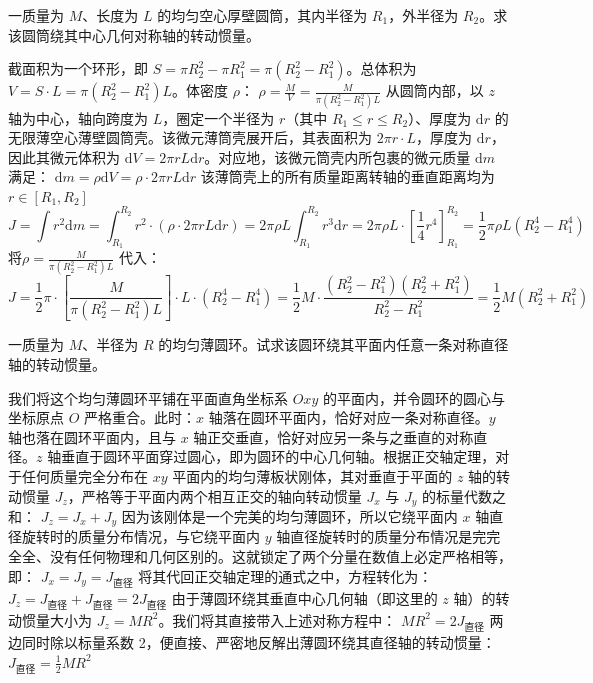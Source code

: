 \documentclass[lang=cn,11pt]{elegantbook}
\begin{document}
\begin{example}
 一质量为 $M$、长度为 $L$ 的均匀空心厚壁圆筒，其内半径为 $R_1$，外半径为 $R_2$。求该圆筒绕其中心几何对称轴的转动惯量。
\end{example}
\begin{solution}
 截面积为一个环形，即 $S = \pi R_2^2 - \pi R_1^2 = \pi(R_2^2 - R_1^2)$。总体积为 $V = S \cdot L = \pi(R_2^2 - R_1^2)L$。体密度 $\rho$： \(\rho = \frac{M}{V} = \frac{M}{\pi(R_2^2 - R_1^2)L}\) 
 从圆筒内部，以 $z$ 轴为中心，轴向跨度为 $L$，圈定一个半径为 $r$（其中 $R_1 \le r \le R_2$）、厚度为 $\mathrm{d}r$ 的无限薄空心薄壁圆筒壳。该微元薄筒壳展开后，其表面积为 $2\pi r \cdot L$，厚度为 $\mathrm{d}r$，因此其微元体积为 $\mathrm{d}V = 2\pi r L \mathrm{d}r$。对应地，该微元筒壳内所包裹的微元质量 $\mathrm{d}m$ 满足： \(\mathrm{d}m = \rho \mathrm{d}V = \rho \cdot 2\pi r L \mathrm{d}r\) 
 该薄筒壳上的所有质量距离转轴的垂直距离均为 $r\in [R_1, R_2]$
 $$J = \int r^2 \mathrm{d}m = \int_{R_1}^{R_2} r^2 \cdot \left( \rho \cdot 2\pi r L \mathrm{d}r \right)= 2\pi \rho L \int_{R_1}^{R_2} r^3 \mathrm{d}r= 2\pi \rho L \cdot \left[ \frac{1}{4}r^4 \right]_{R_1}^{R_2} = \frac{1}{2}\pi \rho L (R_2^4 - R_1^4)$$
 将$\rho = \frac{M}{\pi(R_2^2 - R_1^2)L}$ 代入：
 $$J = \frac{1}{2}\pi \cdot \left[ \frac{M}{\pi(R_2^2 - R_1^2)L} \right] \cdot L \cdot (R_2^4 - R_1^4)= \frac{1}{2}M \cdot \frac{(R_2^2 - R_1^2)(R_2^2 + R_1^2)}{R_2^2 - R_1^2} = \frac{1}{2}M(R_2^2 + R_1^2)$$
\end{solution}

\begin{example}
一质量为 $M$、半径为 $R$ 的均匀薄圆环。试求该圆环绕其平面内任意一条对称直径轴的转动惯量。
\end{example}
\begin{solution}
 我们将这个均匀薄圆环平铺在平面直角坐标系 $Oxy$ 的平面内，并令圆环的圆心与坐标原点 $O$ 严格重合。此时：$x$ 轴落在圆环平面内，恰好对应一条对称直径。$y$ 轴也落在圆环平面内，且与 $x$ 轴正交垂直，恰好对应另一条与之垂直的对称直径。$z$ 轴垂直于圆环平面穿过圆心，即为圆环的中心几何轴。根据正交轴定理，对于任何质量完全分布在 $xy$ 平面内的均匀薄板状刚体，其对垂直于平面的 $z$ 轴的转动惯量 $J_z$，严格等于平面内两个相互正交的轴向转动惯量 $J_x$ 与 $J_y$ 的标量代数之和： \(J_z = J_x + J_y\) 因为该刚体是一个完美的均匀薄圆环，所以它绕平面内 $x$ 轴直径旋转时的质量分布情况，与它绕平面内 $y$ 轴直径旋转时的质量分布情况是完完全全、没有任何物理和几何区别的。这就锁定了两个分量在数值上必定严格相等，即： \(J_x = J_y = J_{\text{直径}}\) 将其代回正交轴定理的通式之中，方程转化为： \(J_z = J_{\text{直径}} + J_{\text{直径}} = 2J_{\text{直径}}\) 由于薄圆环绕其垂直中心几何轴（即这里的 $z$ 轴）的转动惯量大小为 $J_z = MR^2$。我们将其直接带入上述对称方程中： \(MR^2 = 2J_{\text{直径}}\) 两边同时除以标量系数 2，便直接、严密地反解出薄圆环绕其直径轴的转动惯量： \(J_{\text{直径}} = \frac{1}{2}MR^2\) 
\end{solution}
\end{document}

